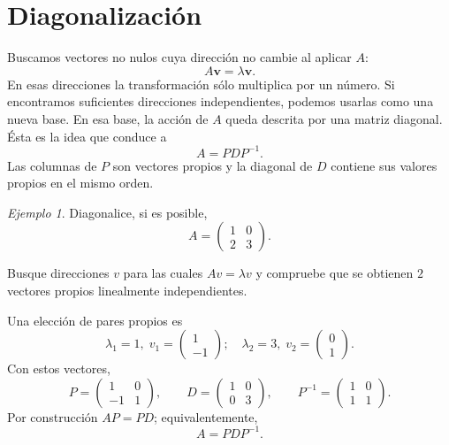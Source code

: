 \documentclass[12pt]{article}
\theoremstyle{remark}
\newtheorem{Ejem}[definicion]{Ejemplo}
\begin{document}
\section{Diagonalización}

Buscamos vectores no nulos cuya dirección no cambie al aplicar $A$:
\[
A\mathbf v=\lambda\mathbf v.
\]
En esas direcciones la transformación sólo multiplica por un número. Si encontramos suficientes direcciones independientes, podemos usarlas como una nueva base.
\medskip
En esa base, la acción de $A$ queda descrita por una matriz diagonal. Ésta es la idea que conduce a
\[
\boxed{A=PDP^{-1}}.
\]
Las columnas de $P$ son vectores propios y la diagonal de $D$ contiene sus valores propios en el mismo orden.

\begin{Ejem}

Diagonalice, si es posible,
\[
A=\begin{pmatrix}1 & 0\\2 & 3\end{pmatrix}.
\]

Busque direcciones $v$ para las cuales $Av=\lambda v$ y compruebe que se obtienen $2$ vectores propios linealmente independientes.

\scriptsize
Una elección de pares propios es
\[
\lambda_1=1,\;v_1=\begin{pmatrix}1\\-1\end{pmatrix};\quad \lambda_2=3,\;v_2=\begin{pmatrix}0\\1\end{pmatrix}.
\]
Con estos vectores,
\[
P=\begin{pmatrix}1 & 0\\-1 & 1\end{pmatrix},\qquad D=\begin{pmatrix}1 & 0\\0 & 3\end{pmatrix},\qquad P^{-1}=\begin{pmatrix}1 & 0\\1 & 1\end{pmatrix}.
\]
Por construcción $AP=PD$; equivalentemente,
\[
\boxed{A=PDP^{-1}}.
\]
\end{Ejem}
\end{document}
